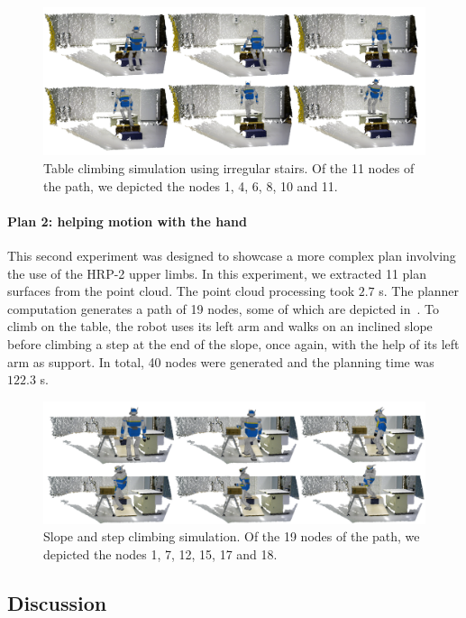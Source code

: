 \begin{figure}
  \centering
  \includegraphics[width=\linewidth]{hrp2stairs.png}
  \caption{Table climbing simulation using irregular stairs. Of the 11 nodes of the path, we depicted the nodes 1, 4, 6, 8, 10 and 11.}
\label{fig:table-climbing-simulation-stair}
\end{figure}

\paragraph{Plan 2: helping motion with the hand}
This second experiment was designed to showcase a more complex plan involving the use of the HRP-2 upper limbs.
In this experiment, we extracted 11 plan surfaces from the point cloud.
The point cloud processing took $2.7$ s.
The planner computation generates a path of 19 nodes, some of which are depicted in~.
To climb on the table, the robot uses its left arm and walks on an inclined slope before climbing a step at the end of the slope, once again, with the help of its left arm as support.
In total, 40 nodes were generated and the planning time was $122.3$ s.

\begin{figure}
  \centering
  \includegraphics[width=\linewidth]{hrp2slope.png}
  \caption{Slope and step climbing simulation. Of the 19 nodes of the path, we depicted the nodes 1, 7, 12, 15, 17 and 18.}
\label{fig:crapahut-simulation}
\end{figure}

\subsection{Discussion}
\label{sub:discussion_planning_pcl}

